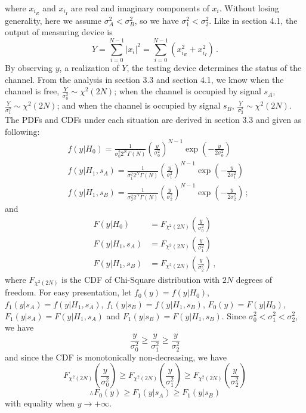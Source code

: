 where $x_{i_R}$ and $x_{i_I}$ are real and imaginary components of $x_i$. 
Without losing generality, here we assume $\sigma_A^2 < \sigma_B^2$, so we have $\sigma_1^2 < \sigma_2^2$. 
Like in section 4.1, the output of measuring device is
\begin{equation} 
  Y = \sum_{i=0}^{N-1}|x_i|^2 = \sum_{i=0}^{N-1}(x_{i_R}^2+x_{i_I}^2)\,.
  \label{equ: testing device2}
\end{equation}
By observing $y$, a realization of $Y$, the testing device determines the status of the channel. From the analysis in section 3.3 and section 4.1, we know when the channel is free, $\frac{Y}{\sigma_0^2} \sim \chi^2(2N)$; when the channel is occupied by signal $s_A$, $\frac{Y}{\sigma_1^2} \sim \chi^2(2N)$; and when the channel is occupied by signal $s_B$, $\frac{Y}{\sigma_2^2} \sim \chi^2(2N)$.  The PDFs and CDFs under each situation are derived in section 3.3 and given as following: 
\def \CHISQUY[#1]{\frac{1}{#1 2^N\Gamma(N)}\left(\frac{y}{#1}\right)^{N-1}\exp\left(-\frac{y}{2#1}\right)}
\begin{equation}
  \begin{split}
   &f(y|H_0) = \CHISQUY[\sigma_0^2]\\
  &f(y|H_1, s_A)=  \CHISQUY[\sigma_1^2]\\
  &f(y|H_1, s_B)=  \CHISQUY[\sigma_2^2]\,;
\end{split}
  \label{20150621a4}
\end{equation} 
and
\begin{equation}
  \begin{split}
    F(y|H_0) &= F_{\chi^2(2N)}(\frac{y}{\sigma_0^2})\\
    F(y|H_1, s_A) &= F_{\chi^2(2N)}(\frac{y}{\sigma_1^2})\\
    F(y|H_1, s_B) &= F_{\chi^2(2N)}(\frac{y}{\sigma_2^2})\,,
  \end{split}
\end{equation}
where $F_{\chi^2(2N)}$ is the CDF of Chi-Square distribution with $2N$ degrees of freedom. 
For easy presentation, let $f_0(y) = f(y|H_0)$, $f_1(y|s_A) = f(y|H_1, s_A)$, $f_1(y|s_B) = f(y|H_1, s_B)$, $F_0(y) = F(y|H_0)$, $F_1(y|s_A) = F(y|H_1, s_A)$ and $F_1(y|s_B) = F(y|H_1, s_B)$. 
Since $\sigma_0^2 < \sigma_1^2 < \sigma_2^2$, we have 
\begin{equation}
  \frac{y}{\sigma_0^2} \geq \frac{y}{\sigma_1^2} \geq \frac{y}{\sigma_2^2}
\end{equation}
and since the CDF is monotonically non-decreasing, we have 
\begin{equation}
  F_{\chi^2(2N)}(\frac{y}{\sigma_0^2}) \geq F_{\chi^2(2N)}(\frac{y}{\sigma_1^2}) \geq  F_{\chi^2(2N)}(\frac{y}{\sigma_2^2})
  \label{20150701a0}
\end{equation}
\begin{equation} 
\therefore  F_0(y) \geq F_1(y|s_A) \geq F_1(y|s_B)
  \label{20150623a1}
\end{equation}
with equality when $y \rightarrow +\infty$.


